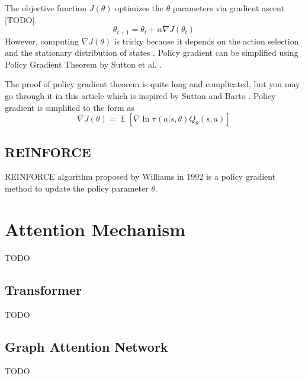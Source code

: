         The objective function $J(\theta)$ optimizes the $\theta$ parameters via gradient ascent [TODO]. 
        \begin{equation}
            \theta_{t+1} = \theta_{t} + \alpha \nabla J(\theta_{t})
        \end{equation}
        However, computing $\nabla J(\theta)$ is tricky because it depends on the action selection and the stationary distribution of states \cite{policy-weng}. Policy gradient can be simplified using Policy Gradient Theorem by Sutton et al. \cite{policy-gradient}.
        
        The proof of policy gradient theorem is quite long and complicated, but you may go through it in this article \cite{policy-weng} which is inspired by Sutton and Barto \cite{rl-intro}. Policy gradient is simplified to the form as
        \begin{equation}
            \nabla J(\theta) = \mathop{\mathbb{E}}[ \nabla \ln \pi (a|s, \theta) Q_{\theta}(s, a)]
        \end{equation}
    
        \subsection{REINFORCE}\label{reinforce}
        REINFORCE algorithm proposed by Williams \cite{reinforce} in 1992 is a policy gradient method to update the policy parameter $\theta$.
        
        \begin{algorithm}
        \end{algorithm}
    

    \section{Attention Mechanism}\label{attention}
    TODO    

    \subsection{Transformer}\label{transformer}
    TODO
    
    \subsection{Graph Attention Network}\label{graph-attention-network}
    TODO
    
    

